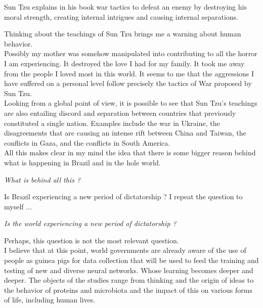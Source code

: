 \documentclass[11pt]{book}
\begin{document}
\noindent Sun Tzu explains in his book war tactics to defeat an enemy by destroying his moral strength, creating internal intrigues and causing internal separations.

\noindent Thinking about the teachings of Sun Tzu brings me a warning about human behavior. \\

\noindent Possibly my mother was somehow manipulated into contributing to all the horror I am experiencing. It destroyed the love I had for my family. It took me away from the people I loved most in this world. It seems to me that the aggressions I have suffered on a personal level follow precisely the tactics of War proposed by Sun Tzu. \\

\noindent Looking from a global point of view, it is possible to see that Sun Tzu's teachings are also entailing discord and separation between countries that previously constituted a single nation. Examples include the war in Ukraine, the disagreements that are causing an intense rift between China and Taiwan, the conflicts in Gaza, and the conflicts in South America. \\

\noindent All this makes clear in my mind the idea that there is some bigger reason behind what is happening in Brazil and in the hole world.

\noindent \begin{center} \emph{What is behind all this ?} \end{center}

\noindent Is Brazil experiencing a new period of dictatorship ? I repeat the question to myself ...

\noindent \begin{center} \emph{Is the world experiencing a new period of dictatorship ?} \end{center}

\noindent Perhaps, this question is not the most relevant question. \\

\noindent I believe that at this point, world governments are already aware of the use of people as guinea pigs for data collection that will be used to feed the training and testing of new and diverse neural networks. Whose learning becomes deeper and deeper. The objects of the studies range from thinking and the origin of ideas to the behavior of proteins and microbiota and the impact of this on various forms of life, including human lives. \\
\end{document}
